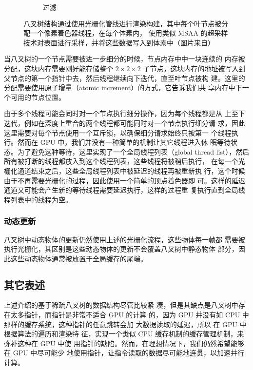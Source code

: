 \begin{figure}
\begin{fullwidth}
\begin{subfigure}[b]{0.2425\thewidth}
		\caption{过滤}
	\end{subfigure}
	\caption{八叉树结构通过使用光栅化管线进行渲染构建，其中每个叶节点被分配一个像素着色器线程，在每个体素内， 使用类似 MSAA 的超采样技术对表面进行采样，并将这些数据写入到体素中（图片来自\cite{a:Practicalreal-timevoxelbasedglobalilluminationforcurrentgpus}）}
	\label{f:vct-voxel-1}
\end{fullwidth}
\end{figure}

当八叉树的一个节点需要被进一步细分的时候，节点内存中中一块连续的 内存被分配，这块内存需要刚好能存储整个 $2\times 2\times 2$ 子节点，这块内存的地址被写入到父节点的第一个指针中去，然后线程继续向下迭代，直至叶节点被构 建。这里的分配需要使用原子增量（atomic increment）的方式，它告诉我们共 享内存中下一个可用的节点位置。

由于多个线程可能会同时对一个节点执行细分操作，因为每个线程都是从 上至下迭代，例如在深度上重合的两个线程都可能同时对一个节点执行细分请 求，因此这里需要对每个节点使用一个互斥锁，以确保细分请求始终只被第一 个线程执行。然而在 GPU 中，我们并没有一种简单的机制让其它线程进入休 眠等待状态。为了避免这种等待，这里实现了一个全局线程列表（global thread list），然后所有被打断的线程都放入到这个线程列表，这些线程将被稍后执行， 在每一个光栅化通道结束之后，这些全局线程列表中被延迟的线程再被重新执 行，这个时候由于不再需要光栅化的过程，因此使用一个简单的顶点着色器即 可。这样的延迟通道又可能会产生新的等待线程需要延迟执行，这样的过程重 复执行直到全局线程列表中的线程为空。



\subsubsection{动态更新}
八叉树中动态物体的更新仍然使用上述的光栅化流程，这些物体每一帧都 需要被执行光栅化，其区别是这些动态物体的更新不会覆盖八叉树中静态物体 部分，因此这些动态物体通常被放置于全局缓存的尾端。



\subsection{其它表述}
上述介绍的基于稀疏八叉树的数据结构\cite{a:InteractiveIndirectIlluminationUsingVoxelConeTracing}尽管比较紧 凑，但是其缺点是八叉树中存在太多指针，而指针是非常不适合 GPU 的计算 的，因为 GPU 并没有如 CPU 中那样的缓存系统，这种指针的任意跳转会加 大数据读取的延迟，所以 \cite{a:Gigavoxels:Avoxelbasedrenderingpipelineforefficientexplorationoflargeanddetailedscenes} 在 GPU 中根据算法的遍历和渲染特 征，实现一个类似 CPU 缓存机制的缓存管理机制，来弥补这种在 GPU 中使 用指针的缺陷。然而，在理想情况下，我们仍然希望能够在 GPU 中尽可能少 地使用指针，让指令读取的数据尽可能地连贯，以加速并行计算。

